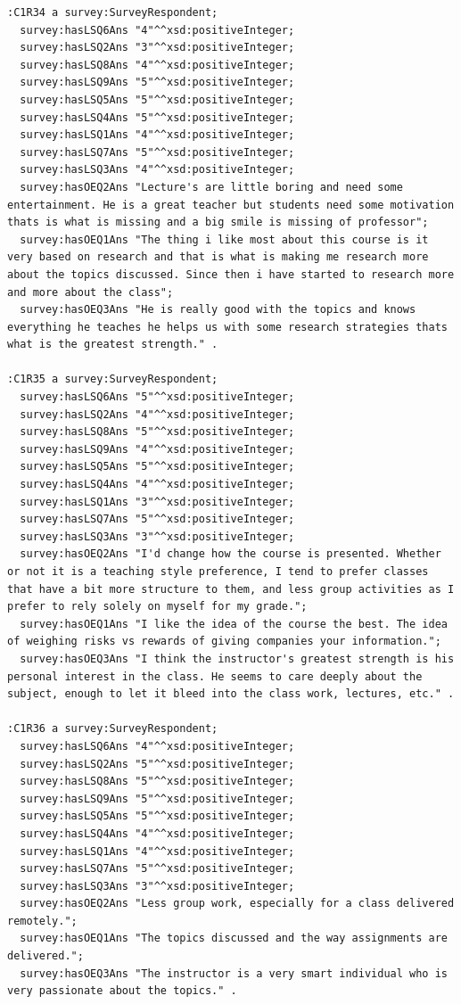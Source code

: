 \begin{lstlisting}
:C1R34 a survey:SurveyRespondent;
  survey:hasLSQ6Ans "4"^^xsd:positiveInteger;
  survey:hasLSQ2Ans "3"^^xsd:positiveInteger;
  survey:hasLSQ8Ans "4"^^xsd:positiveInteger;
  survey:hasLSQ9Ans "5"^^xsd:positiveInteger;
  survey:hasLSQ5Ans "5"^^xsd:positiveInteger;
  survey:hasLSQ4Ans "5"^^xsd:positiveInteger;
  survey:hasLSQ1Ans "4"^^xsd:positiveInteger;
  survey:hasLSQ7Ans "5"^^xsd:positiveInteger;
  survey:hasLSQ3Ans "4"^^xsd:positiveInteger;
  survey:hasOEQ2Ans "Lecture's are little boring and need some entertainment. He is a great teacher but students need some motivation thats is what is missing and a big smile is missing of professor";
  survey:hasOEQ1Ans "The thing i like most about this course is it very based on research and that is what is making me research more about the topics discussed. Since then i have started to research more and more about the class";
  survey:hasOEQ3Ans "He is really good with the topics and knows everything he teaches he helps us with some research strategies thats what is the greatest strength." .

:C1R35 a survey:SurveyRespondent;
  survey:hasLSQ6Ans "5"^^xsd:positiveInteger;
  survey:hasLSQ2Ans "4"^^xsd:positiveInteger;
  survey:hasLSQ8Ans "5"^^xsd:positiveInteger;
  survey:hasLSQ9Ans "4"^^xsd:positiveInteger;
  survey:hasLSQ5Ans "5"^^xsd:positiveInteger;
  survey:hasLSQ4Ans "4"^^xsd:positiveInteger;
  survey:hasLSQ1Ans "3"^^xsd:positiveInteger;
  survey:hasLSQ7Ans "5"^^xsd:positiveInteger;
  survey:hasLSQ3Ans "3"^^xsd:positiveInteger;
  survey:hasOEQ2Ans "I'd change how the course is presented. Whether or not it is a teaching style preference, I tend to prefer classes that have a bit more structure to them, and less group activities as I prefer to rely solely on myself for my grade.";
  survey:hasOEQ1Ans "I like the idea of the course the best. The idea of weighing risks vs rewards of giving companies your information.";
  survey:hasOEQ3Ans "I think the instructor's greatest strength is his personal interest in the class. He seems to care deeply about the subject, enough to let it bleed into the class work, lectures, etc." .

:C1R36 a survey:SurveyRespondent;
  survey:hasLSQ6Ans "4"^^xsd:positiveInteger;
  survey:hasLSQ2Ans "5"^^xsd:positiveInteger;
  survey:hasLSQ8Ans "5"^^xsd:positiveInteger;
  survey:hasLSQ9Ans "5"^^xsd:positiveInteger;
  survey:hasLSQ5Ans "5"^^xsd:positiveInteger;
  survey:hasLSQ4Ans "4"^^xsd:positiveInteger;
  survey:hasLSQ1Ans "4"^^xsd:positiveInteger;
  survey:hasLSQ7Ans "5"^^xsd:positiveInteger;
  survey:hasLSQ3Ans "3"^^xsd:positiveInteger;
  survey:hasOEQ2Ans "Less group work, especially for a class delivered remotely.";
  survey:hasOEQ1Ans "The topics discussed and the way assignments are delivered.";
  survey:hasOEQ3Ans "The instructor is a very smart individual who is very passionate about the topics." .


\end{lstlisting}
